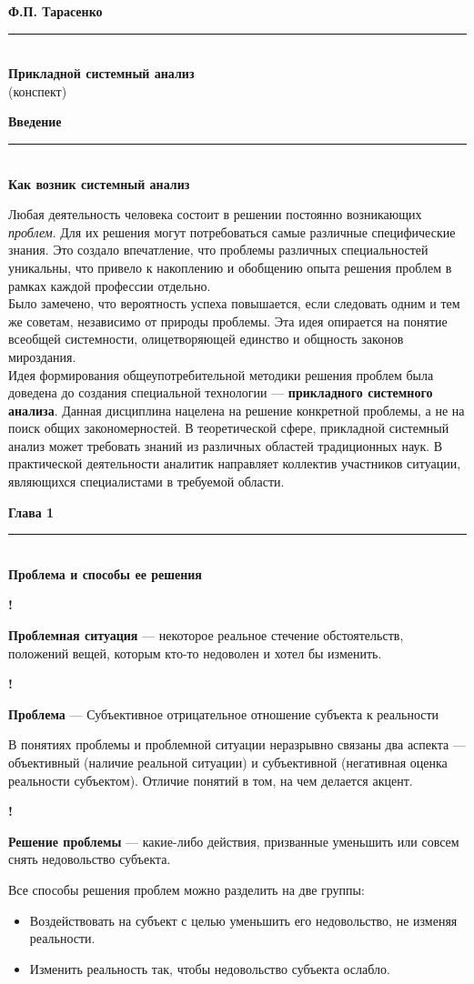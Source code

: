 \documentclass{article}
\newcommand{\note}[1]{\textit{#1}}
\newcommand{\important}[1]{\textbf{#1}}
\renewcommand{\section}[2]{
	\vspace{6em}
	\begin{flushright}
	\Large
	\baselineskip=0.5\baselineskip
	\textbf{#1}
	\\
	\rule[0.5\baselineskip]{\textwidth}{0.15pt}
	\\
	\textbf{#2}
	\end{flushright}
	}
\renewcommand{\title}[2]{
	\begin{center}
		\LARGE
		\baselineskip=0.5\baselineskip
		\textbf{#1}
		\\
		\rule[0.5\baselineskip]{0.7\textwidth}{0.15pt}
		\\
		\textbf{#2}
		\\\baselineskip=2\baselineskip(конспект)		
	\end{center}
	}
\newcommand{\define}[2]{
	\textbf{#1} --- #2
	}
\newcommand{\definewithmark}[2]{
	\begin{flushright}\textbf{!}\hspace{2ex}\vline\hspace{2ex}
		\begin{minipage}{0.9\textwidth}
			\define{#1}{#2}
		\end{minipage}
	\end{flushright}
	}
\begin{document}
\title{Ф.П. Тарасенко}{Прикладной системный анализ}
\section{Введение}{Как возник системный анализ}
Любая деятельность человека состоит в решении постоянно возникающих \note{проблем}. Для их решения могут потребоваться самые различные специфические знания. Это создало впечатление, что проблемы различных специальностей уникальны, что привело к накоплению и обобщению опыта решения проблем в рамках каждой профессии отдельно.\\
Было замечено, что вероятность успеха повышается, если следовать одним и тем же советам, независимо от природы проблемы. Эта идея опирается на понятие всеобщей системности, олицетворяющей единство и общность законов мироздания.\\
Идея формирования общеупотребительной методики решения проблем была доведена до создания специальной технологии --- \important{прикладного системного анализа}. Данная дисциплина нацелена на решение конкретной проблемы, а не на поиск общих закономерностей. В теоретической сфере, прикладной системный анализ может требовать знаний из различных областей традиционных наук. В практической деятельности аналитик направляет коллектив участников ситуации, являющихся специалистами в требуемой области.
\section{Глава 1}{Проблема и способы ее решения}
\definewithmark{Проблемная ситуация}{некоторое реальное стечение обстоятельств, положений вещей, которым кто-то недоволен и хотел бы изменить.}
\definewithmark{Проблема}{Субъективное отрицательное отношение субъекта к реальности}
В понятиях проблемы и проблемной ситуации неразрывно связаны два аспекта --- объективный (наличие реальной ситуации) и субъективной (негативная оценка реальности субъектом). Отличие понятий в том, на чем делается акцент.
\definewithmark{Решение проблемы}{какие-либо действия, призванные уменьшить или совсем снять недовольство субъекта.}
Все способы решения проблем можно разделить на две группы:
\begin{itemize}
	\item Воздействовать на субъект с целью уменьшить его недовольство, не изменяя реальности.
	\item Изменить реальность так, чтобы недовольство субъекта ослабло.
\end{itemize}
\end{document}
